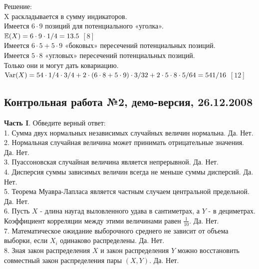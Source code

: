 \documentclass[12pt, a4paper]{article}\usepackage[]{graphicx}\usepackage[]{color}
\begin{document}
	Решение: \\
	X раскладывается в сумму индикаторов.\\
	Имеется $6\cdot9$ позиций для потенциального «уголка». \\
	$\mathbb{E}(X)=6\cdot9\cdot1/4=13.5$ $[8]$ \\
	Имеется $6\cdot5+5\cdot9$ «боковых» пересечений потенциальных позиций. \\
	Имеется $5\cdot8$ «угловых» пересечений потенциальных позиций. \\
	Только они и могут дать ковариацию. \\
	$\operatorname{Var}(X)=54\cdot1/4\cdot3/4+2\cdot(6\cdot8+5\cdot9)\cdot3/32+2\cdot5\cdot8\cdot5/64=541/16$ $[12]$\\



	\subsection{Контрольная работа №2, демо-версия, 26.12.2008}

	\textbf{Часть I}. Обведите верный ответ: \\

	1. Сумма двух нормальных независимых случайных величин нормальна.
	Да. Нет. \\

	2. Нормальная случайная величина может принимать отрицательные
	значения. Да. Нет. \\

	3. Пуассоновская случайная величина является непрерывной. Да. Нет.
	\\

	4. Дисперсия суммы зависимых величин всегда не меньше суммы
	дисперсий. Да. Нет. \\

	5. Теорема Муавра-Лапласа является частным случаем центральной
	предельной. Да. Нет. \\

	6. Пусть $X$ - длина наугад выловленного удава в сантиметрах, а
	$Y$ - в дециметрах. Коэффициент корреляции между этими
	величинами равен $\frac{1}{10}$. Да. Нет. \\

	7. Математическое ожидание выборочного среднего не зависит от
	объема выборки, если $X_{i}$ одинаково распределены. Да. Нет. \\

	8. Зная закон распределения $X$ и закон распределения $Y$
	можно восстановить совместный закон распределения пары $(X,Y)$. Да. Нет. \\
\end{document}
